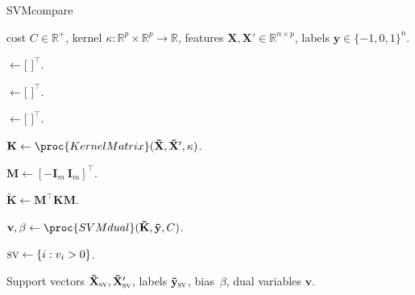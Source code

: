 \documentclass{article}
\newcommand{\sv}{\textsc{sv}}
\newcommand{\RR}{\mathbb R}
\begin{document}
\begin{algorithm}[b!]
   \caption{SVMcompare}
   \label{alg:SVMcompare}
\begin{algorithmic}
   cost $C\in\RR^+$, kernel
  $\kappa:\RR^p\times \RR^p \rightarrow \RR$, features $\mathbf
  X,\mathbf X'\in\RR^{n \times p}$, labels $\mathbf y\in\{-1,0,1\}^n$.

  \STATE {} $\gets [$
  $]^\intercal$.

  \STATE {} $\gets [$
  $]^\intercal$.

  \STATE {} $\gets [$
  $]^\intercal$.

  \STATE $\mathbf K \gets \proc{KernelMatrix}(
  \mathbf{\tilde X}, \mathbf{\tilde X'}, \kappa)$.

  \STATE $\mathbf M \gets [ -\mathbf I_m\ \mathbf I_m ]^\intercal$.

  \STATE $\mathbf{\tilde K} \gets \mathbf M^\intercal \mathbf  K \mathbf M$.

  \STATE $\mathbf v,\beta \gets \proc{SVMdual}(
  \mathbf{\tilde K}, \mathbf{\tilde y}, C)$.

  \STATE $\sv \gets\{i: v_i>0\}$.
  
   Support vectors $\mathbf{\tilde
    X}_{\sv },\mathbf{\tilde X}_{\sv }'$, labels
  $\mathbf{\tilde y}_{\sv }$, bias~$\beta$, dual variables $\mathbf v$.

   \end{algorithmic}
\end{algorithm}
\end{document}
